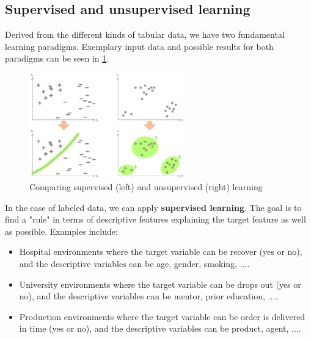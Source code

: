 \subsection{Supervised and unsupervised learning}
Derived from the different kinds of tabular data, we have two fundamental learning paradigms. Exemplary input data and possible results for both paradigms can be seen in \ref{fig:1_sv_vs_usv}.

\begin{figure}[h]
  \centering
  \includegraphics[width=0.6\textwidth]{assets/basics/SV_vs_US.png}
  \caption{Comparing supervised (left) and unsupervised (right) learning}
  \label{fig:1_sv_vs_usv}
\end{figure}

In the case of labeled data, we can apply \textbf{supervised learning}. The goal is to find a "rule" in terms of descriptive features explaining the target feature as well as possible. Examples include:
\begin{itemize}
  \item Hospital environments where the target variable can be {\color{ForestGreen}recover (yes or no)}, and the descriptive variables can be {\color{ForestGreen}age, gender, smoking, $\dots$}.
  \item University environments where the target variable can be {\color{ForestGreen}drops out (yes or no)}, and the descriptive variables can be {\color{ForestGreen}mentor, prior education, $\dots$}.
  \item Production environments where the target variable can be {\color{ForestGreen}order is delivered in time (yes or no)}, and the descriptive variables can be {\color{ForestGreen}product, agent, $\dots$}.
\end{itemize}

